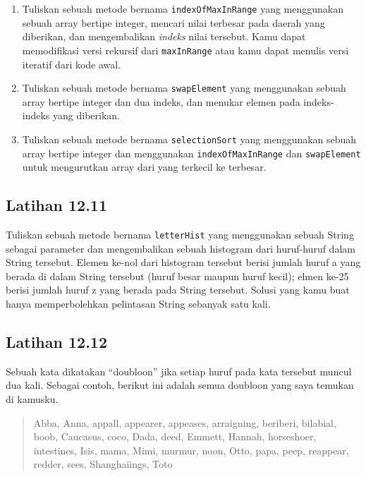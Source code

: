 \begin{enumerate}

\item Tuliskan sebuah metode bernama {\tt indexOfMaxInRange} yang menggunakan sebuah array bertipe integer, mencari nilai terbesar pada daerah yang diberikan, dan mengembalikan {\em indeks} nilai tersebut.
Kamu dapat memodifikasi versi rekursif dari {\tt maxInRange} atau kamu dapat menulis versi iteratif dari kode awal.

\item Tuliskan sebuah metode bernama {\tt swapElement} yang menggunakan sebuah array bertipe integer dan dua indeks, dan menukar elemen pada indeks-indeks yang diberikan.

\item Tuliskan sebuah metode bernama {\tt selectionSort} yang menggunakan sebuah array bertipe integer dan menggunakan {\tt indexOfMaxInRange} dan {\tt swapElement}
untuk mengurutkan array dari yang terkecil ke terbesar.

\end{enumerate}



\subsection{Latihan 12.11}
Tuliskan sebuah metode bernama {\tt letterHist} yang menggunakan sebuah String sebagai parameter dan mengembalikan sebuah histogram dari huruf-huruf dalam String tersebut.
Elemen ke-nol dari histogram tersebut berisi jumlah huruf a yang berada di dalam String tersebut (huruf besar maupun huruf kecil); elmen ke-25 berisi jumlah huruf z yang berada pada String tersebut. Solusi yang kamu buat hanya memperbolehkan pelintasan String sebanyak satu kali.



\subsection{Latihan 12.12}
Sebuah kata dikatakan “doubloon” jika setiap huruf pada kata tersebut muncul dua kali. Sebagai contoh, berikut ini adalah semua doubloon yang saya temukan di kamusku.

\begin{quote}
Abba, Anna, appall, appearer, appeases, arraigning, beriberi,
bilabial, boob, Caucasus, coco, Dada, deed, Emmett, Hannah,
horseshoer, intestines, Isis, mama, Mimi, murmur, noon, Otto, papa,
peep, reappear, redder, sees, Shanghaiings, Toto
\end{quote}

